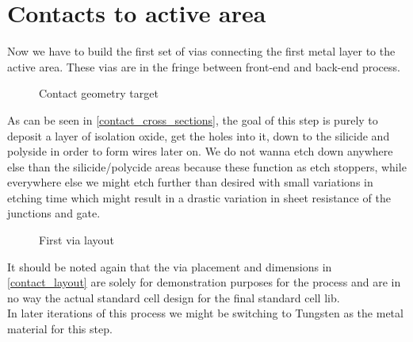 \section{Contacts to active area}\label{contact}

Now we have to build the first set of vias connecting the first metal layer to the active area.
These vias are in the fringe between front-end and back-end process.

\begin{figure}[H]
	\centering
	\begin{tikzpicture}[node distance = 3cm, auto, thick,scale=\CrossAndTopSectionBig, every node/.style={transform shape}]
		
	\end{tikzpicture}
	\begin{tikzpicture}[node distance = 3cm, auto, thick,scale=\CrossAndTopSectionBig, every node/.style={transform shape}]
		
	\end{tikzpicture}
	\caption{Contact geometry target}
	\label{contact_cross_sections}
\end{figure}

As can be seen in \autoref{contact_cross_sections}, the goal of this step is purely to deposit a layer of isolation oxide, get the holes into it, down to the silicide and polyside in order to form wires later on.
We do not wanna etch down anywhere else than the silicide/polycide areas because these function as etch stoppers, while everywhere else we might etch further than desired with small variations in etching time which might result in a drastic variation in sheet resistance of the junctions and gate.

\begin{figure}[H]
	\centering
	\begin{tikzpicture}[node distance =1cm, auto, thick,scale=\VLSILayout, every node/.style={transform shape}]
		
	\end{tikzpicture}
	\caption{First via layout}
	\label{contact_layout}
\end{figure}

It should be noted again that the via placement and dimensions in \autoref{contact_layout} are solely for demonstration purposes for the process and are in no way the actual standard cell design for the final standard cell lib. \\

In later iterations of this process we might be switching to Tungsten as the metal material for this step.

